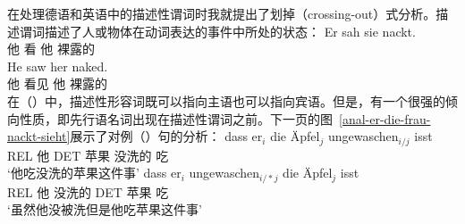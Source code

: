 在处理德语和英语中的描述性谓词时我就提出了划掉（crossing-out）式分析\citep{Mueller2004c,Mueller2008a}。描述谓词描述了人或物体在动词表达的事件中所处的状态：
\eal
\ex 
\gll Er sah sie nackt.\footnotemark\\
	他 看 他 裸露的\\
\ex 
\gll He saw her naked.\\
	他 看见 他 裸露的\\
\zl
在（）中，描述性形容词既可以指向主语也可以指向宾语。但是，有一个很强的倾向性质，即先行语名词出现在描述性谓词之前\citep[]{Loetscher85}。下一页的图~\vref{anal-er-die-frau-nackt-sieht}展示了对例（）句的分析：
\eal
\ex 
\gll dass er$_i$ die Äpfel$_j$ ungewaschen$_{i/j}$ isst\\
	 REL 他 DET 苹果 没洗的 吃\\
\glt `他吃没洗的苹果这件事'
\ex 
\gll dass er$_i$ ungewaschen$_{i/*j}$ die Äpfel$_j$ isst\\
	 REL 他 没洗的 DET 苹果 吃\\
\glt `虽然他没被洗但是他吃苹果这件事'
\zl
